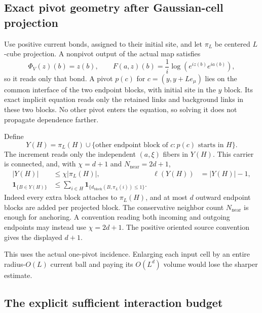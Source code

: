 \subsection{Exact pivot geometry after Gaussian-cell projection}

Use positive current bonds, assigned to their initial site, and
let $\pi_L$ be centered $L$-cube projection. A nonpivot output
of the actual map satisfies
\[
 \Phi_V(z)(b)=z(b),\qquad
 F(a,z)(b)=\frac1i\log(e^{iz(b)}e^{ia(b)}),
\]
so it reads only that bond. A pivot $p(c)$ for
$c=(y,y+Le_\mu)$ lies on the common interface of the two
endpoint blocks, with initial site in the $y$ block. Its exact
implicit equation reads only the retained links and background
links in these two blocks. No other pivot enters the equation,
so solving it does not propagate dependence farther.

Define
\begin{equation}\label{qi-projected-carrier}
 Y(H)=\pi_L(H)\cup
 \{\text{other endpoint block of }c: p(c)\text{ starts in }H\}.
\end{equation}
The increment reads only the independent $(a,\xi)$ fibers in
$Y(H)$. This carrier is connected, and, with
$\chi=d+1$ and $N_{\mathrm{near}}=2d+1$,
\begin{align}
 |Y(H)|&\le\chi|\pi_L(H)|,
 &\ell(Y(H))&=|Y(H)|-1,                              \label{qi-projected-size}\\
 \mathbf1_{\{B\in Y(H)\}}
 &\le\sum_{i\in H}\mathbf1_{\{d_{\mathrm{block}}(B,\pi_L(i))\le1\}}.
                                                               \label{qi-projected-anchor}
\end{align}
Indeed every extra block attaches to $\pi_L(H)$, and at most
$d$ outward endpoint blocks are added per projected block.
The conservative neighbor count $N_{\mathrm{near}}$ is enough
for anchoring. A convention reading both incoming and outgoing
endpoints may instead use $\chi=2d+1$. The positive oriented
source convention gives the displayed $d+1$.

This uses the actual one-pivot incidence. Enlarging each input
cell by an entire radius-$O(L)$ current ball and paying its
$O(L^d)$ volume would lose the sharper estimate.

\subsection{The explicit sufficient interaction budget}

